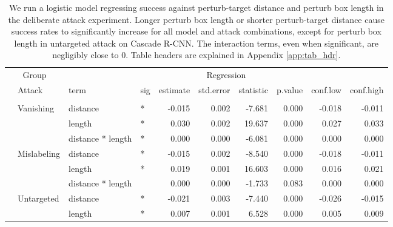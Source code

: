 \begingroup\fontsize{9}{11}\selectfont

\begin{longtable}[t]{llllrrrrrr}
\caption{\label{tab:arbitrary_trend_table}We run a logistic model regressing success against perturb-target distance and perturb box length in the deliberate attack experiment. Longer perturb box length or shorter perturb-target distance cause success rates to significantly increase for all model and attack combinations, except for perturb box length in untargeted attack on Cascade R-CNN. The interaction terms, even when significant, are negligibly close to 0. Table headers are explained in Appendix \ref{app:tab_hdr}.}\\
\toprule
\multicolumn{2}{c}{Group} & \multicolumn{8}{c}{Regression} \\
\cmidrule(l{3pt}r{3pt}){1-2} \cmidrule(l{3pt}r{3pt}){3-10}
 & Attack & term & sig & estimate & std.error & statistic & p.value & conf.low & conf.high\\
\midrule
\addlinespace[0.3em]
\multicolumn{10}{l}{\textbf{YOLOv3}}\\
\hspace{1em} & Vanishing & distance & * & -0.015 & 0.002 & -7.681 & 0.000 & -0.018 & -0.011\\
\cmidrule{3-10}\nopagebreak
\hspace{1em} &  & length & * & 0.030 & 0.002 & 19.637 & 0.000 & 0.027 & 0.033\\
\cmidrule{3-10}\nopagebreak
\hspace{1em} &  & distance * length & * & 0.000 & 0.000 & -6.081 & 0.000 & 0.000 & 0.000\\
\cmidrule{2-10}\nopagebreak
\hspace{1em} & Mislabeling & distance & * & -0.015 & 0.002 & -8.540 & 0.000 & -0.018 & -0.011\\
\cmidrule{3-10}\nopagebreak
\hspace{1em} &  & length & * & 0.019 & 0.001 & 16.603 & 0.000 & 0.016 & 0.021\\
\cmidrule{3-10}\nopagebreak
\hspace{1em} &  & distance * length &  & 0.000 & 0.000 & -1.733 & 0.083 & 0.000 & 0.000\\
\cmidrule{2-10}\nopagebreak
\hspace{1em} & Untargeted & distance & * & -0.021 & 0.003 & -7.440 & 0.000 & -0.026 & -0.015\\
\cmidrule{3-10}\nopagebreak
\hspace{1em} &  & length & * & 0.007 & 0.001 & 6.528 & 0.000 & 0.005 & 0.009\\

\end{longtable}
